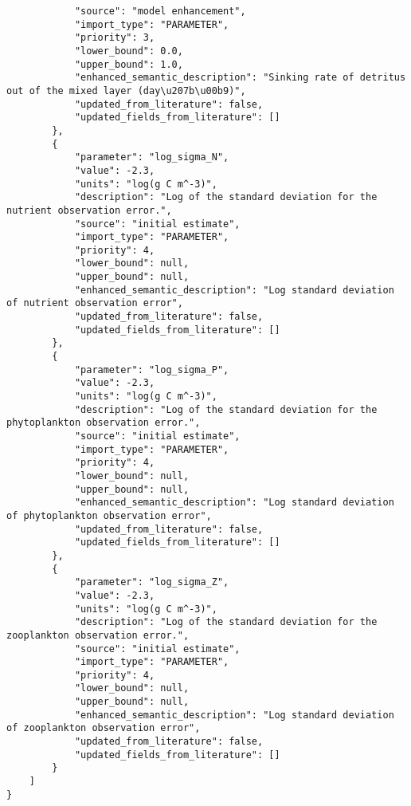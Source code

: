 \begin{lstlisting}
            "source": "model enhancement",
            "import_type": "PARAMETER",
            "priority": 3,
            "lower_bound": 0.0,
            "upper_bound": 1.0,
            "enhanced_semantic_description": "Sinking rate of detritus out of the mixed layer (day\u207b\u00b9)",
            "updated_from_literature": false,
            "updated_fields_from_literature": []
        },
        {
            "parameter": "log_sigma_N",
            "value": -2.3,
            "units": "log(g C m^-3)",
            "description": "Log of the standard deviation for the nutrient observation error.",
            "source": "initial estimate",
            "import_type": "PARAMETER",
            "priority": 4,
            "lower_bound": null,
            "upper_bound": null,
            "enhanced_semantic_description": "Log standard deviation of nutrient observation error",
            "updated_from_literature": false,
            "updated_fields_from_literature": []
        },
        {
            "parameter": "log_sigma_P",
            "value": -2.3,
            "units": "log(g C m^-3)",
            "description": "Log of the standard deviation for the phytoplankton observation error.",
            "source": "initial estimate",
            "import_type": "PARAMETER",
            "priority": 4,
            "lower_bound": null,
            "upper_bound": null,
            "enhanced_semantic_description": "Log standard deviation of phytoplankton observation error",
            "updated_from_literature": false,
            "updated_fields_from_literature": []
        },
        {
            "parameter": "log_sigma_Z",
            "value": -2.3,
            "units": "log(g C m^-3)",
            "description": "Log of the standard deviation for the zooplankton observation error.",
            "source": "initial estimate",
            "import_type": "PARAMETER",
            "priority": 4,
            "lower_bound": null,
            "upper_bound": null,
            "enhanced_semantic_description": "Log standard deviation of zooplankton observation error",
            "updated_from_literature": false,
            "updated_fields_from_literature": []
        }
    ]
}
\end{lstlisting}
